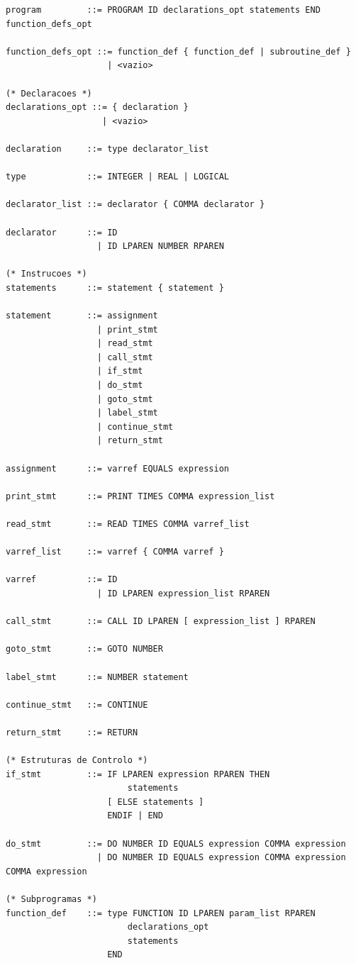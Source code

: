 \documentclass[12pt, a4paper]{article}
\begin{document}
\begin{lstlisting}[caption=Gramática BNF do Compilador]
program         ::= PROGRAM ID declarations_opt statements END function_defs_opt

function_defs_opt ::= function_def { function_def | subroutine_def }
                    | <vazio>

(* Declaracoes *)
declarations_opt ::= { declaration }
                   | <vazio>

declaration     ::= type declarator_list

type            ::= INTEGER | REAL | LOGICAL

declarator_list ::= declarator { COMMA declarator }

declarator      ::= ID
                  | ID LPAREN NUMBER RPAREN

(* Instrucoes *)
statements      ::= statement { statement }

statement       ::= assignment
                  | print_stmt
                  | read_stmt
                  | call_stmt
                  | if_stmt
                  | do_stmt
                  | goto_stmt
                  | label_stmt
                  | continue_stmt
                  | return_stmt

assignment      ::= varref EQUALS expression

print_stmt      ::= PRINT TIMES COMMA expression_list

read_stmt       ::= READ TIMES COMMA varref_list

varref_list     ::= varref { COMMA varref }

varref          ::= ID
                  | ID LPAREN expression_list RPAREN

call_stmt       ::= CALL ID LPAREN [ expression_list ] RPAREN

goto_stmt       ::= GOTO NUMBER

label_stmt      ::= NUMBER statement

continue_stmt   ::= CONTINUE

return_stmt     ::= RETURN

(* Estruturas de Controlo *)
if_stmt         ::= IF LPAREN expression RPAREN THEN
                        statements
                    [ ELSE statements ]
                    ENDIF | END

do_stmt         ::= DO NUMBER ID EQUALS expression COMMA expression
                  | DO NUMBER ID EQUALS expression COMMA expression COMMA expression

(* Subprogramas *)
function_def    ::= type FUNCTION ID LPAREN param_list RPAREN
                        declarations_opt
                        statements
                    END


\end{lstlisting}
\end{document}
